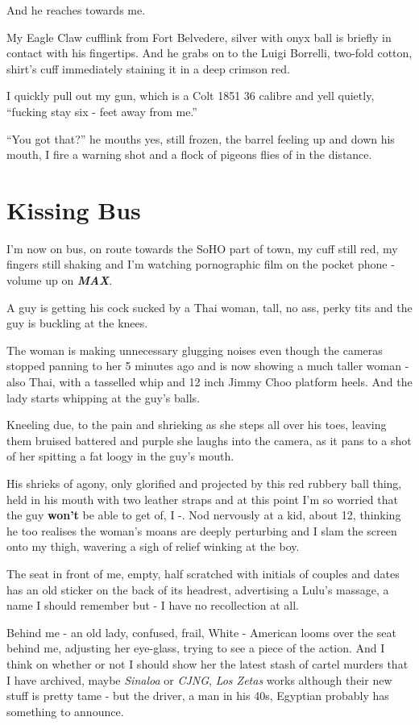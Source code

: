 \documentclass[19pt,openany]{book}
\begin{document}
And he reaches towards me.

My Eagle Claw cufflink from
Fort Belvedere, silver with onyx ball is briefly in contact with his fingertips.
And he grabs on to the Luigi Borrelli, two-fold cotton, shirt's cuff
immediately staining it in a deep crimson red.

I quickly pull out my gun,
which is a Colt 1851 36 calibre and yell quietly, ``fucking
stay six - feet
away from me.''

``You got that?'' he mouths yes, still frozen, the barrel
feeling up and down his mouth, I fire a warning
shot and a flock of pigeons flies of in the distance.



\chapter{Kissing Bus}
I'm now on bus,
on route towards the SoHO part
of town, my cuff still red, my fingers
still shaking and I'm watching pornographic film on
the pocket phone - volume up on \textit{\textbf{MAX}}.

A guy is getting his cock sucked by a Thai woman, tall, no ass,
perky tits and the guy is buckling at the knees.

The woman is making unnecessary glugging noises even though
the cameras stopped panning to her 5 minutes
ago and is now showing a much
taller woman -also Thai, with a tasselled whip and 12 inch
Jimmy Choo platform heels. And the lady starts whipping
at the guy's balls.

Kneeling due, to the pain and shrieking as she steps all over
his toes, leaving them bruised battered and purple she laughs
into the camera, as it pans to a shot of her spitting
a fat loogy in the guy's mouth.

His shrieks of agony, only glorified and projected
by this red rubbery ball thing, held
in his mouth with two leather straps and at this point
I'm so worried that the guy \textbf{won't} be able to get of,
I -. Nod nervously at a kid, about 12, thinking he too realises
the woman's moans are deeply perturbing and I slam the screen
onto my thigh, wavering a sigh of relief winking at the boy.

The seat in front of me, empty,
half scratched with initials
of couples and dates
has an old sticker on the back
of its headrest, advertising a
Lulu's massage, a name I should remember
but - I have no recollection at all.

Behind me - an old lady,
confused, frail, White
- American looms over the seat
behind me,
adjusting her eye-glass, trying
to see a piece of the action.
And I think on whether
or not I should show her
the latest stash of cartel murders
that I have archived, maybe
\textit{Sinaloa} or \textit{CJNG},
\textit{Los Zetas} works
although their new stuff is pretty tame - but the driver,
a man in his 40s, Egyptian probably has something to announce.
\end{document}
